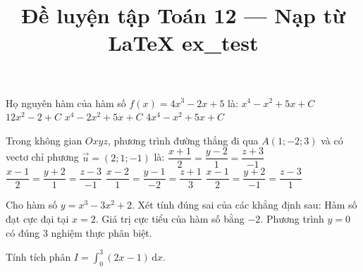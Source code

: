 \title{Đề luyện tập Toán 12 — Nạp từ LaTeX ex\_test}

\begin{ex}%
Họ nguyên hàm của hàm số $f(x) = 4x^3 - 2x + 5$ là:
\choice
{\True $x^4 - x^2 + 5x + C$}
{$12x^2 - 2 + C$}
{$x^4 - 2x^2 + 5x + C$}
{$4x^4 - x^2 + 5x + C$}
\end{ex}

\begin{ex}%
Trong không gian $Oxyz$, phương trình đường thẳng đi qua $A(1; -2; 3)$ và có vectơ chỉ phương $\vec{u} = (2; 1; -1)$ là:
\choice
{$\dfrac{x+1}{2} = \dfrac{y-2}{1} = \dfrac{z+3}{-1}$}
{\True $\dfrac{x-1}{2} = \dfrac{y+2}{1} = \dfrac{z-3}{-1}$}
{$\dfrac{x-2}{1} = \dfrac{y-1}{-2} = \dfrac{z+1}{3}$}
{$\dfrac{x-1}{2} = \dfrac{y+2}{-1} = \dfrac{z-3}{1}$}
\end{ex}

\begin{ex}%
Cho hàm số $y = x^3 - 3x^2 + 2$. Xét tính đúng sai của các khẳng định sau:
{Hàm số đạt cực đại tại $x = 2$.}
{\True Giá trị cực tiểu của hàm số bằng $-2$.}
{\True Phương trình $y = 0$ có đúng $3$ nghiệm thực phân biệt.}
\end{ex}

\begin{ex}%
Tính tích phân $I = \displaystyle \int_0^3 (2x - 1)\,\mathrm{d}x$.
\end{ex}


